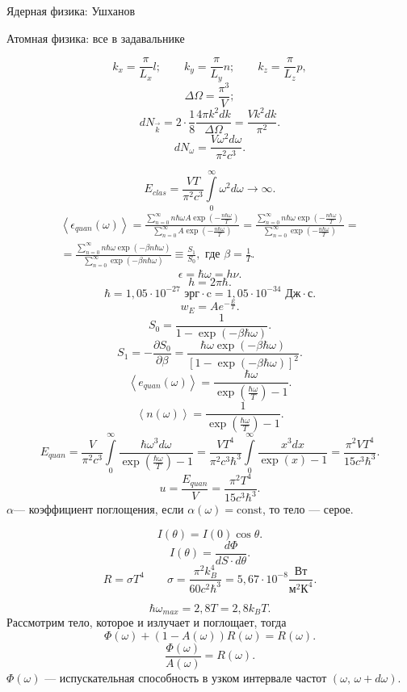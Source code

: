 Ядерная физика: Ушханов

Атомная физика: все в задавальнике

\[
k_x= \frac{\pi}{L_x}l;\qquad k_y= \frac{\pi}{L_y}n; \qquad k_z= \frac{\pi}{L_z}p,
\]
\[
\Delta \Omega = \frac{\pi^3}{V};
\] 
\[
	d N_{\vec{k}}=2 \cdot \frac{1}{8} \frac{4\pi k^2 dk}{
	\Delta \Omega}= \frac{V k^2 dk}{\pi^2}
.\]
\[
	d N_\omega = \frac{V \omega^2 d \omega}{\pi^2 c^3}
.\] 
\begin{figure}[ht]
    \centering
    \caption{}
    \label{fig:1}
\end{figure}

\[
E_{clas}= \frac{VT}{\pi^2 c^3}\int\limits_{0}^{\infty} \omega^2 d\omega \to  \infty 
.\] 
\begin{multline*}
	\left< \epsilon_{quan}(\omega) \right> =
	\frac{\sum_{n=0}^{\infty}n \hbar \omega A \exp\left( 
	-\frac{n \hbar \omega}{T}\right) }{\sum_{n=0}^{\infty} A
\exp \left( - \frac{n \hbar \omega}{T} \right) }=
\frac{\sum_{n=0}^{\infty} n \hbar \omega \exp\left( - \frac{
n \hbar \omega}{T} \right) }{\sum_{n=0}^{\infty} \exp \left( -
\frac{n \hbar \omega}{T}\right) }=\\=
\frac{\sum_{n=0}^{\infty} n \hbar \omega \exp \left(-\beta n \hbar \omega\right)}{\sum_{n=0}^{\infty} \exp\left(-\beta n \hbar \omega\right)}\equiv \frac{
S_1}{S_0}, \text{ где } \beta=\frac{1}{T}
.\end{multline*} 
\[
\epsilon=\hbar \omega= h \nu
.\] 
\[
h= 2 \pi \hbar
.\] 
\[
	\hbar=1,05 \cdot 10^{-27} \text{ эрг}\cdot \text{c}=
	1,05 \cdot 10^{-34} \text{ Дж}\cdot \text{с}
.\] 
\[
w_E = A e^{-\frac{E}{T}}
.\]
\[
	S_0= \frac{1}{1-\exp(-\beta \hbar \omega)}
.\] 
\[
S_1=-\frac{\partial S_0}{\partial \beta} =\frac{\hbar \omega
\exp(-\beta \hbar \omega)}{[1-\exp(-\beta \hbar \omega)]^2}
.\] 
\[
	\left<e_{quan}(\omega) \right> = \frac{\hbar \omega}{\exp
	\left( \frac{\hbar\omega}{T} \right) -1}
.\]
\[
	\left<n(\omega) \right> = \frac{1}{\exp\left( \frac{\hbar
	\omega}{T} \right) -1}
.\] 
\[
	E_{quan}= \frac{V}{\pi^2 c^3}\int\limits_{0}^{\infty} 
	\frac{\hbar \omega^3 d \omega}{\exp\left( \frac{\hbar \omega}{T} \right) -1}= \frac{V T^4}{\pi^2 c^3 \hbar^3} \int\limits_{0}^{\infty} \frac{x^3 dx}{\exp(x) -1}= \frac{\pi^2 V T^4}{15c^3 \hbar^3} 
.\]
\[
u = \frac{E_{quan}}{V}=\frac{\pi^2 T^4}{15 c^3 \hbar^3}
.\] 
$\alpha$--- коэффициент поглощения, если  $\alpha(\omega)=\text{const}$, то тело --- серое.
\begin{figure}[ht]
    \centering
    \caption{}
    \label{fig:2}
\end{figure}
\[
	I(\theta)=I(0) \cos \theta
.\] 
\[
	I(\theta)=\frac{d\Phi}{dS\cdot d\theta}
.\] 
\[
R= \sigma T^4 \qquad \sigma = \frac{\pi^2 k_B^4}{60 c^2 \hbar^3}=
5,67\cdot 10^{-8} \frac{\text{Вт}}{\text{м}^2 \text{К}^4}
.\] 
\begin{figure}[ht]
    \centering
    \caption{}
    \label{fig:3}
\end{figure}
\[
\hbar \omega_{max}=2,8 T=2,8 k_B T
.\] 
Рассмотрим тело, которое и излучает и поглощает, тогда 
\[
	\Phi(\omega)+(1-A(\omega))R(\omega)=R(\omega)
.\] 
\[
	\frac{\Phi(\omega)}{A(\omega)}=R(\omega)
.\]
$\Phi(\omega)$ --- испускательная способность в узком интервале частот
$(\omega,\, \omega+d\omega)$. 
